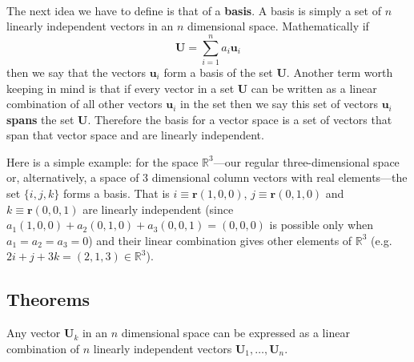 \documentclass[english,seminar,headertitle]{lecture}
\begin{document}
\noindent{}\\

\noindent The next idea we have to define is that of a \textbf{basis}. A basis is simply a set of $n$ linearly independent vectors in an $n$ dimensional space. Mathematically if
\begin{equation}
	\mathbf{U} = \sum_{i=1}^n a_i\mathbf{u}_i \label{eq:basis}
\end{equation}
then we say that the vectors $\mathbf{u}_i$ form a basis of the set $\mathbf{U}$. Another term worth keeping in mind is that if every vector in a set $\mathbf{U}$ can be written as a linear combination of all other vectors $\mathbf{u}_i$ in the set then we say this set of vectors $\mathbf{u}_i$ \textbf{spans} the set $\mathbf{U}$. Therefore the basis for a vector space is a set of vectors that span that vector space and are linearly independent.

Here is a simple example: for the space $\mathbb{R}^3$---our regular three-dimensional space or, alternatively, a space of 3 dimensional column vectors with real elements---the set $\{i, j, k \}$ forms a basis. That is $i \equiv \mathbf{r}(1,0,0)$, $j \equiv \mathbf{r}(0,1,0)$ and $k \equiv \mathbf{r}(0,0,1)$ are linearly independent (since $a_1(1,0,0) + a_2(0,1,0) + a_3(0,0,1) = (0,0,0)$ is possible only when $a_1 = a_2 = a_3 = 0$) and their linear combination gives other elements of $\mathbb{R}^3$ (e.g. $2i + j + 3k = (2, 1, 3) \in \mathbb{R}^3$).

\subsection{Theorems}
\begin{theorem}
	Any vector $\mathbf{U}_k$ in an $n$ dimensional space can be expressed as a linear combination of $n$ linearly independent vectors $\mathbf{U}_1, \ldots, \mathbf{U}_n$.
\end{theorem}
\end{document}
